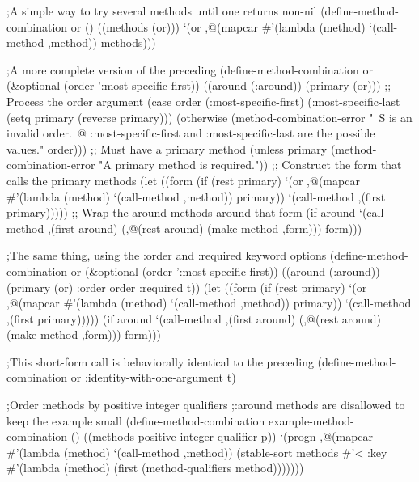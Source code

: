 ;A simple way to try several methods until one returns non-nil
 (define-method-combination or ()
         ((methods (or)))
   `(or ,@(mapcar #'(lambda (method)
                      `(call-method ,method))
                  methods)))
  
;A more complete version of the preceding
 (define-method-combination or 
         (&optional (order ':most-specific-first))
         ((around (:around))
          (primary (or)))
   ;; Process the order argument
   (case order
     (:most-specific-first)
     (:most-specific-last (setq primary (reverse primary)))
     (otherwise (method-combination-error "~S is an invalid order.~@
     :most-specific-first and :most-specific-last are the possible values."
                                          order)))
   ;; Must have a primary method
   (unless primary
     (method-combination-error "A primary method is required."))
   ;; Construct the form that calls the primary methods
   (let ((form (if (rest primary)
                   `(or ,@(mapcar #'(lambda (method)
                                      `(call-method ,method))
                                  primary))
                   `(call-method ,(first primary)))))
     ;; Wrap the around methods around that form
     (if around
         `(call-method ,(first around)
                       (,@(rest around)
                        (make-method ,form)))
         form)))
  
;The same thing, using the :order and :required keyword options
 (define-method-combination or 
         (&optional (order ':most-specific-first))
         ((around (:around))
          (primary (or) :order order :required t))
   (let ((form (if (rest primary)
                   `(or ,@(mapcar #'(lambda (method)
                                      `(call-method ,method))
                                  primary))
                   `(call-method ,(first primary)))))
     (if around
         `(call-method ,(first around)
                       (,@(rest around)
                        (make-method ,form)))
         form)))
  
;This short-form call is behaviorally identical to the preceding
 (define-method-combination or :identity-with-one-argument t)
 
;Order methods by positive integer qualifiers
;:around methods are disallowed to keep the example small
 (define-method-combination example-method-combination ()
         ((methods positive-integer-qualifier-p))
   `(progn ,@(mapcar #'(lambda (method)
                         `(call-method ,method))
                     (stable-sort methods #'<
                       :key #'(lambda (method)
                                (first (method-qualifiers method)))))))
 
